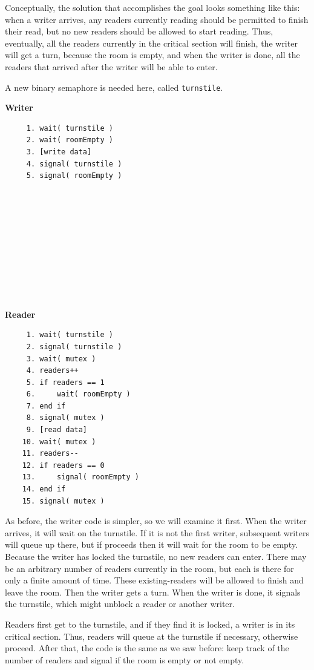 Conceptually, the solution that accomplishes the goal looks something like this: when a writer arrives, any readers currently reading should be permitted to finish their read, but no new readers should be allowed to start reading. Thus, eventually, all the readers currently in the critical section will finish, the writer will get a turn, because the room is empty, and when the writer is done, all the readers that arrived after the writer will be able to enter.

A new binary semaphore is needed here, called \texttt{turnstile}. 

\begin{multicols}{2}
\textbf{Writer}\vspace{-2em}
  \begin{verbatim}
	 1. wait( turnstile )
	 2. wait( roomEmpty )
	 3. [write data]
	 4. signal( turnstile )
	 5. signal( roomEmpty )
	 
	 
	 
	 
	 
	 
	 
	 
	 
	 
  \end{verbatim}
\columnbreak
\textbf{Reader}\vspace{-2em}
  \begin{verbatim}
	 1. wait( turnstile )
	 2. signal( turnstile )
	 3. wait( mutex )
	 4. readers++
	 5. if readers == 1
	 6.     wait( roomEmpty )
	 7. end if
	 8. signal( mutex )
	 9. [read data]
	10. wait( mutex )
	11. readers--
	12. if readers == 0
	13.     signal( roomEmpty )
	14. end if
	15. signal( mutex )
  \end{verbatim}
\end{multicols}
\vspace{-2em}

As before, the writer code is simpler, so we will examine it first. When the writer arrives, it will wait on the turnstile. If it is not the first writer, subsequent writers will queue up there, but if proceeds then it will wait for the room to be empty. Because the writer has locked the turnstile, no new readers can enter. There may be an arbitrary number of readers currently in the room, but each is there for only a finite amount of time. These existing-readers will be allowed to finish and leave the room. Then the writer gets a turn. When the writer is done, it signals the turnstile, which might unblock a reader or another writer. 

Readers first get to the turnstile, and if they find it is locked, a writer is in its critical section. Thus, readers will queue at the turnstile if necessary, otherwise proceed. After that, the code is the same as we saw before: keep track of the number of readers and signal if the room is empty or not empty.

